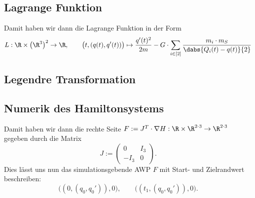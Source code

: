 \documentclass{subfiles}
\begin{document}
    \subsection*{Lagrange Funktion}
        Damit haben wir dann die Lagrange Funktion in der Form 
        \[
            L:\R\times\bigl(\R^3\bigr)^2\to\R,\qquad \bigl(t,(q(t),q'(t))\bigr)\mapsto\frac{q'(t)^2}{2m} - G\cdot\sum_{i\in[2]}\frac{m_i\cdot m_S}{\dabs{Q_i(t) - q(t)}{2}}
        \]


    \subsection*{Legendre Transformation}


    \subsection*{Numerik des Hamiltonsystems}
        
        Damit haben wir dann die rechte Seite $F:=J^T\cdot\nabla H:\R\times\R^{2\cdot 3}\to\R^{2\cdot 3}$ gegeben durch die Matrix
        \[
            J:=\begin{pmatrix}
                0 & I_{3} \\
                -I_{3} & 0
            \end{pmatrix}.
        \]
        Dies lässt uns nun das simulationsgebende AWP $F$ mit Start- und Zielrandwert beschreiben:
        \[
            \bigl((0,(q_0,q_0')),0\bigr),\qquad \bigl((t_1,(q_0,q_0')),0\bigr).
        \]
\end{document}
